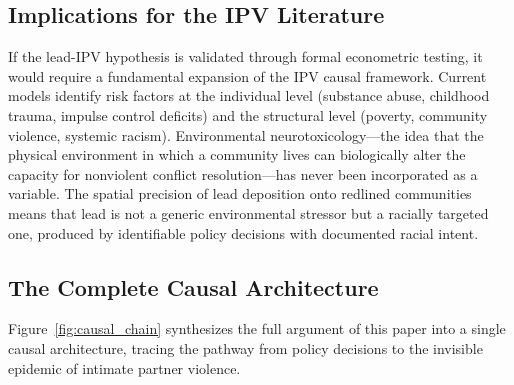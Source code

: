 \documentclass[12pt, letterpaper]{article}
\begin{document}
\subsection{Implications for the IPV Literature}

If the lead-IPV hypothesis is validated through formal econometric testing, it would require a fundamental expansion of the IPV causal framework. Current models identify risk factors at the individual level (substance abuse, childhood trauma, impulse control deficits) and the structural level (poverty, community violence, systemic racism). Environmental neurotoxicology---the idea that the physical environment in which a community lives can biologically alter the capacity for nonviolent conflict resolution---has never been incorporated as a variable. The spatial precision of lead deposition onto redlined communities means that lead is not a generic environmental stressor but a racially targeted one, produced by identifiable policy decisions with documented racial intent.

\subsection{The Complete Causal Architecture}

Figure~\ref{fig:causal_chain} synthesizes the full argument of this paper into a single causal architecture, tracing the pathway from policy decisions to the invisible epidemic of intimate partner violence.
\end{document}
